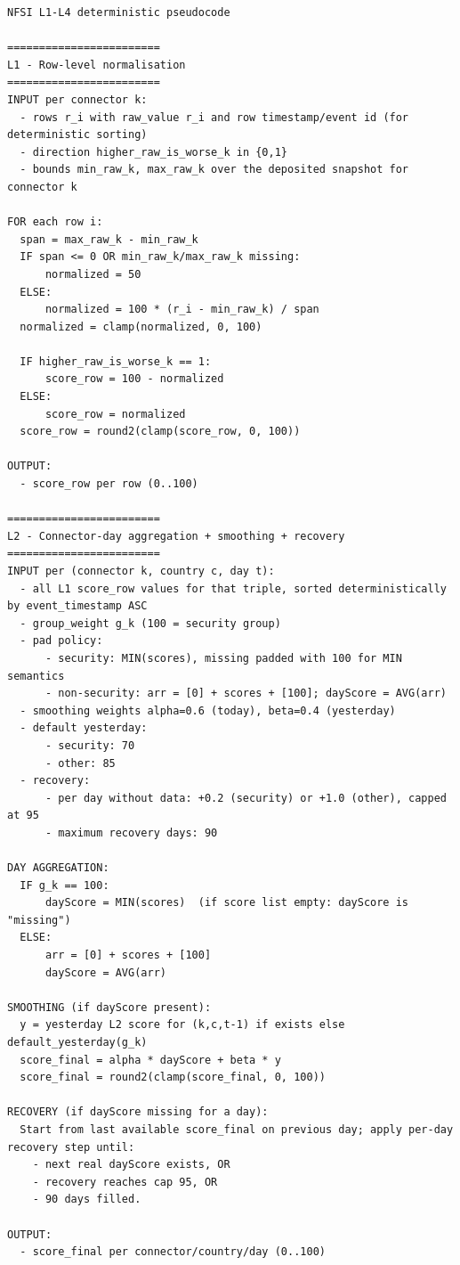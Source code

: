 \documentclass[
  11pt,
  peerreview,journal,onecolumn]{IEEEtran}
\begin{document}
\begin{lstlisting}
NFSI L1-L4 deterministic pseudocode

========================
L1 - Row-level normalisation
========================
INPUT per connector k:
  - rows r_i with raw_value r_i and row timestamp/event id (for deterministic sorting)
  - direction higher_raw_is_worse_k in {0,1}
  - bounds min_raw_k, max_raw_k over the deposited snapshot for connector k

FOR each row i:
  span = max_raw_k - min_raw_k
  IF span <= 0 OR min_raw_k/max_raw_k missing:
      normalized = 50
  ELSE:
      normalized = 100 * (r_i - min_raw_k) / span
  normalized = clamp(normalized, 0, 100)

  IF higher_raw_is_worse_k == 1:
      score_row = 100 - normalized
  ELSE:
      score_row = normalized
  score_row = round2(clamp(score_row, 0, 100))

OUTPUT:
  - score_row per row (0..100)

========================
L2 - Connector-day aggregation + smoothing + recovery
========================
INPUT per (connector k, country c, day t):
  - all L1 score_row values for that triple, sorted deterministically by event_timestamp ASC
  - group_weight g_k (100 = security group)
  - pad policy:
      - security: MIN(scores), missing padded with 100 for MIN semantics
      - non-security: arr = [0] + scores + [100]; dayScore = AVG(arr)
  - smoothing weights alpha=0.6 (today), beta=0.4 (yesterday)
  - default yesterday:
      - security: 70
      - other: 85
  - recovery:
      - per day without data: +0.2 (security) or +1.0 (other), capped at 95
      - maximum recovery days: 90

DAY AGGREGATION:
  IF g_k == 100:
      dayScore = MIN(scores)  (if score list empty: dayScore is "missing")
  ELSE:
      arr = [0] + scores + [100]
      dayScore = AVG(arr)

SMOOTHING (if dayScore present):
  y = yesterday L2 score for (k,c,t-1) if exists else default_yesterday(g_k)
  score_final = alpha * dayScore + beta * y
  score_final = round2(clamp(score_final, 0, 100))

RECOVERY (if dayScore missing for a day):
  Start from last available score_final on previous day; apply per-day recovery step until:
    - next real dayScore exists, OR
    - recovery reaches cap 95, OR
    - 90 days filled.

OUTPUT:
  - score_final per connector/country/day (0..100)


\end{lstlisting}
\end{document}
